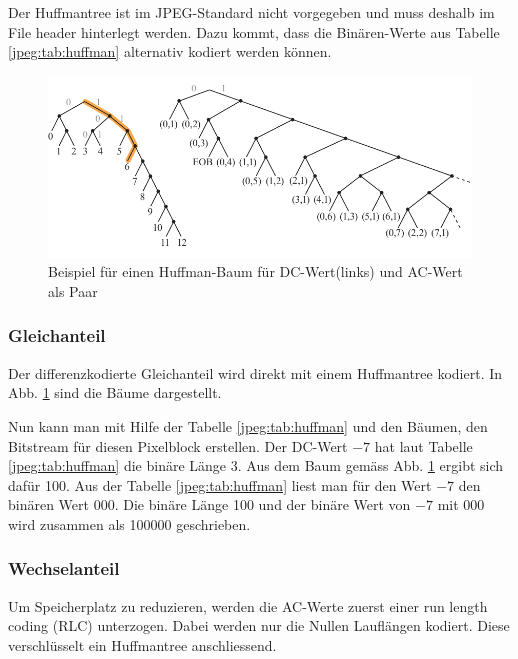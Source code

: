 Der Huffmantree ist im JPEG-Standard nicht vorgegeben und muss deshalb im File header hinterlegt werden.
Dazu kommt, dass die Binären-Werte aus Tabelle \ref{jpeg:tab:huffman} alternativ kodiert werden können.

\begin{figure}[t]
    \centering
    \includegraphics[width=\textwidth]{papers/jpeg/pictures/huffman.pdf}
    \caption{Beispiel für einen Huffman-Baum für DC-Wert(links) und AC-Wert als Paar 
        \label{jpeg:fig:huffman}}
\end{figure}

\subsubsection{Gleichanteil
\label{jpeg:subsubsection:gleichanteil}}
Der differenzkodierte Gleichanteil wird direkt mit einem Huffmantree kodiert.
In Abb. \ref{jpeg:fig:huffman} sind die Bäume dargestellt.


Nun kann man mit Hilfe der Tabelle \ref{jpeg:tab:huffman} und den Bäumen, den Bitstream für diesen Pixelblock erstellen.
Der DC-Wert \(-7\) hat laut Tabelle \ref{jpeg:tab:huffman} die binäre Länge 3.
Aus dem Baum gemäss Abb. \ref{jpeg:fig:huffman} ergibt sich dafür 100.
Aus der Tabelle \ref{jpeg:tab:huffman} liest man für den Wert \(-7\) den binären Wert 000.
Die binäre Länge 100 und der binäre Wert von \(-7\) mit 000 wird zusammen als 100000 geschrieben.

\subsubsection{Wechselanteil
\label{jpeg:subsubsection:wechselanteil}}
Um Speicherplatz zu reduzieren, werden die AC-Werte zuerst einer run length coding (RLC) unterzogen.
Dabei werden nur die Nullen Lauflängen kodiert. 
Diese verschlüsselt ein Huffmantree anschliessend.

